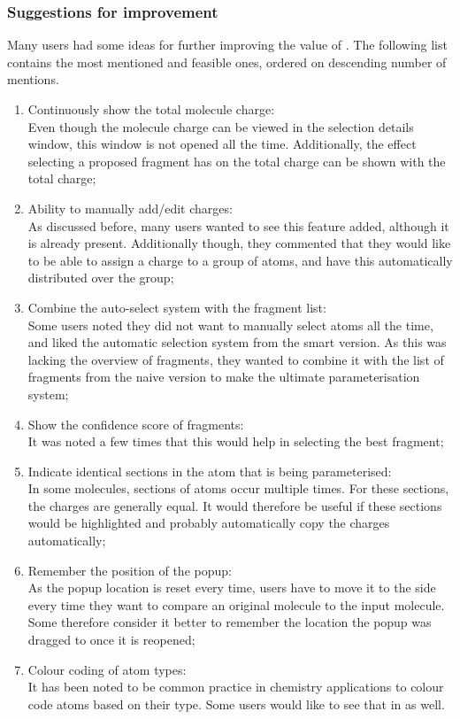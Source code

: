 \subsubsection{Suggestions for improvement}
Many users had some ideas for further improving the value of \oframp. The following list contains the most mentioned and feasible ones, ordered on descending number of mentions.
\begin{enumerate}
\item Continuously show the total molecule charge:\\
Even though the molecule charge can be viewed in the selection details window, this window is not opened all the time. Additionally, the effect selecting a proposed fragment has on the total charge can be shown with the total charge;
\item Ability to manually add/edit charges:\\
As discussed before, many users wanted to see this feature added, although it is already present. Additionally though, they commented that they would like to be able to assign a charge to a group of atoms, and have this automatically distributed over the group;
\item Combine the auto-select system with the fragment list:\\
Some users noted they did not want to manually select atoms all the time, and liked the automatic selection system from the smart version. As this was lacking the overview of fragments, they wanted to combine it with the list of fragments from the naive version to make the ultimate parameterisation system;
\item Show the confidence score of fragments:\\
It was noted a few times that this would help in selecting the best fragment;
\item Indicate identical sections in the atom that is being parameterised:\\
In some molecules, sections of atoms occur multiple times. For these sections, the charges are generally equal. It would therefore be useful if these sections would be highlighted and probably automatically copy the charges automatically;
\item Remember the position of the popup:\\
As the popup location is reset every time, users have to move it to the side every time they want to compare an original molecule to the input molecule. Some therefore consider it better to remember the location the popup was dragged to once it is reopened;
\item Colour coding of atom types:\\
It has been noted to be common practice in chemistry applications to colour code atoms based on their type. Some users would like to see that in \oframp{} as well.
\end{enumerate}
